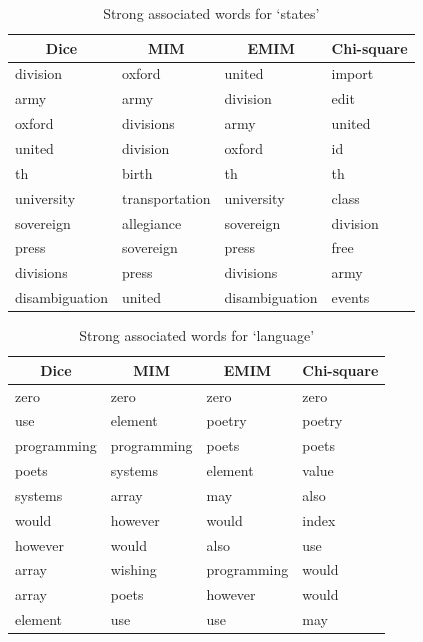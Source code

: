 \documentclass[letterpaper,11pt]{article}
\begin{document}
\begin{table}[H]
\centering
\begin{tabular}{|l|l|l|l|}
\hline
\multicolumn{1}{|c|}{\textbf{Dice}} & \multicolumn{1}{c|}{\textbf{MIM}} & \multicolumn{1}{c|}{\textbf{EMIM}} & \multicolumn{1}{c|}{\textbf{Chi-square}} \\ \hline
division & oxford & united & import \\ \hline
army & army & division & edit \\ \hline
oxford & divisions & army & united \\ \hline
united & division & oxford & id \\ \hline
th & birth & th & th \\ \hline
university & transportation & university & class \\ \hline
sovereign & allegiance & sovereign & division \\ \hline
press & sovereign & press & free \\ \hline
divisions & press & divisions & army \\ \hline
disambiguation & united & disambiguation & events \\ \hline
\end{tabular}
\caption{Strong associated words for `states'}
\label{my-label}
\end{table}

\begin{table}[H]
\centering
\begin{tabular}{|l|l|l|l|}
\hline
\multicolumn{1}{|c|}{\textbf{Dice}} & \multicolumn{1}{c|}{\textbf{MIM}} & \multicolumn{1}{c|}{\textbf{EMIM}} & \multicolumn{1}{c|}{\textbf{Chi-square}} \\ \hline
zero & zero & zero & zero \\ \hline
use & element & poetry & poetry \\ \hline
programming & programming & poets & poets \\ \hline
poets & systems & element & value \\ \hline
systems & array & may & also \\ \hline
would & however & would & index \\ \hline
however & would & also & use \\ \hline
array & wishing & programming & would \\ \hline
array & poets & however & would \\ \hline
element & use & use & may \\ \hline
\end{tabular}
\caption{Strong associated words for `language'}
\label{my-label}
\end{table}
\end{document}
